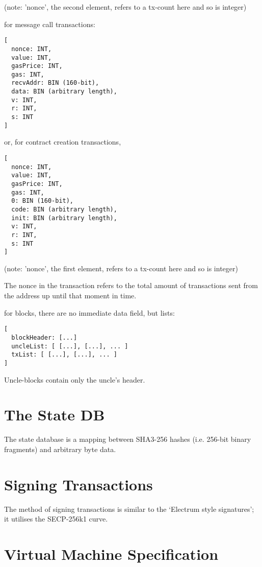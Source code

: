 \documentclass[9pt,oneside]{amsart}
\begin{document}
(note: 'nonce', the second element, refers to a tx-count here and so is integer)

for message call transactions:

\begin{verbatim}
[
  nonce: INT,
  value: INT,
  gasPrice: INT,
  gas: INT,
  recvAddr: BIN (160-bit),
  data: BIN (arbitrary length),
  v: INT,
  r: INT,
  s: INT
]
\end{verbatim}

or, for contract creation transactions,

\begin{verbatim}
[
  nonce: INT,
  value: INT,
  gasPrice: INT,
  gas: INT,
  0: BIN (160-bit),
  code: BIN (arbitrary length),
  init: BIN (arbitrary length),
  v: INT,
  r: INT,
  s: INT
]
\end{verbatim}

(note: 'nonce', the first element, refers to a tx-count here and so is integer)

The nonce in the transaction refers to the total amount of transactions sent from the address up until that moment in time.

for blocks, there are no immediate data field, but lists:

\begin{verbatim}
[
  blockHeader: [...]
  uncleList: [ [...], [...], ... ]
  txList: [ [...], [...], ... ]
]
\end{verbatim}

Uncle-blocks contain only the uncle's header.

\section{The State DB}\label{app:state}

The state database is a mapping between SHA3-256 hashes (i.e. 256-bit binary fragments) and arbitrary byte data.

\section{Signing Transactions}\label{app:signing}

The method of signing transactions is similar to the `Electrum style signatures'; it utilises the SECP-256k1 curve.

\section{Virtual Machine Specification}\label{app:vm}
\end{document}
